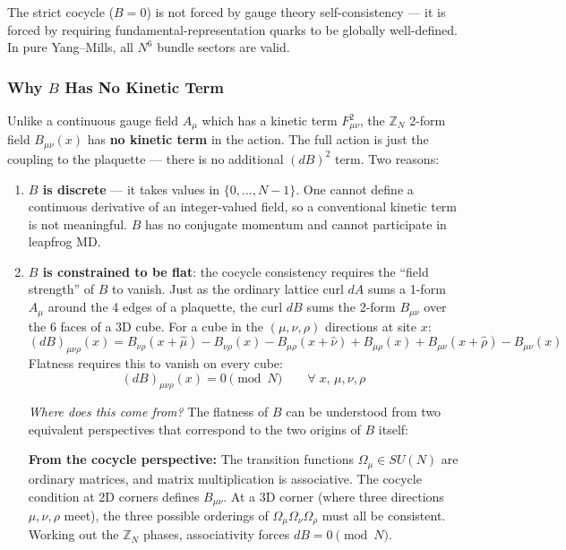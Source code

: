 \documentclass[12pt,a4paper]{article}
\begin{document}
The strict cocycle ($B=0$) is not forced by gauge theory self-consistency ---
it is forced by requiring fundamental-representation quarks to be globally well-defined.
In pure Yang--Mills, all $N^6$ bundle sectors are valid.

\subsubsection*{Why $B$ Has No Kinetic Term}

Unlike a continuous gauge field $A_\mu$ which has a kinetic term $F_{\mu\nu}^2$,
the $\mathbb{Z}_N$ 2-form field $B_{\mu\nu}(x)$ has \textbf{no kinetic term} in the action.
The full action is just the coupling to the plaquette ---
there is no additional $(dB)^2$ term. Two reasons:

\begin{enumerate}
  \item \textbf{$B$ is discrete} --- it takes values in $\{0,\ldots,N{-}1\}$.
    One cannot define a continuous derivative of an integer-valued field,
    so a conventional kinetic term is not meaningful.
    $B$ has no conjugate momentum and cannot participate in leapfrog MD.
  \item \textbf{$B$ is constrained to be flat}: the cocycle consistency
    requires the ``field strength'' of $B$ to vanish.
    Just as the ordinary lattice curl $dA$ sums a 1-form $A_\mu$ around the 4 edges
    of a plaquette, the curl $dB$ sums the 2-form $B_{\mu\nu}$ over the 6 faces of
    a 3D cube. For a cube in the $(\mu,\nu,\rho)$ directions at site $x$:
    \begin{equation}
      (dB)_{\mu\nu\rho}(x) = B_{\nu\rho}(x{+}\hat\mu) - B_{\nu\rho}(x)
        - B_{\mu\rho}(x{+}\hat\nu) + B_{\mu\rho}(x)
        + B_{\mu\nu}(x{+}\hat\rho) - B_{\mu\nu}(x)
    \end{equation}
    Flatness requires this to vanish on every cube:
    \begin{equation}
      (dB)_{\mu\nu\rho}(x) = 0 \pmod{N} \qquad \forall\; x,\,\mu,\nu,\rho
    \end{equation}

    \emph{Where does this come from?}
    The flatness of $B$ can be understood from two equivalent perspectives
    that correspond to the two origins of $B$ itself:

    \textbf{From the cocycle perspective:}
    The transition functions $\Omega_\mu \in SU(N)$ are ordinary matrices,
    and matrix multiplication is associative.
    The cocycle condition at 2D corners defines $B_{\mu\nu}$.
    At a 3D corner (where three directions $\mu,\nu,\rho$ meet),
    the three possible orderings of $\Omega_\mu\Omega_\nu\Omega_\rho$
    must all be consistent.
    Working out the $\mathbb{Z}_N$ phases, associativity forces $dB = 0 \pmod{N}$.


\end{enumerate}
\end{document}
